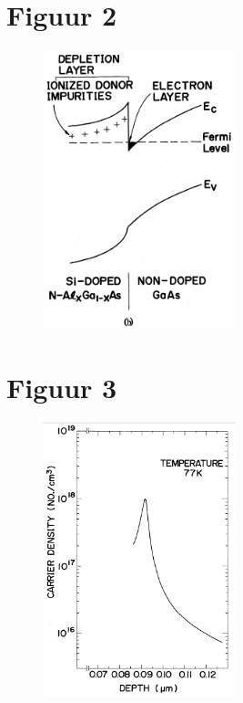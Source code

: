 \documentclass[11pt]{report}
\begin{document}
\section{Figuur 2}
\begin{figure}
\centering
\includegraphics[width=0.5\textwidth]{bandenergy_structure.png}
\caption{}
\end{figure}

\section{Figuur 3}
\begin{figure}
\centering
\includegraphics[width=0.5\textwidth]{carrier_profile_depth.png}
\caption{}
\end{figure}
\end{document}
